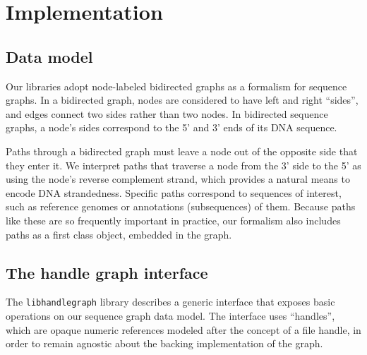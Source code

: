 \documentclass{article}
\begin{document}



\section{Implementation}

\subsection{Data model}

Our libraries adopt node-labeled bidirected graphs as a formalism for sequence graphs.
In a bidirected graph, nodes are considered to have left and right ``sides'', and edges connect two sides rather than two nodes.
In bidirected sequence graphs, a node's sides correspond to the 5' and 3' ends of its DNA sequence. 

Paths through a bidirected graph must leave a node out of the opposite side that they enter it.
We interpret paths that traverse a node from the 3' side to the 5' as using the node's reverse complement strand, which provides a natural means to encode DNA strandedness.
Specific paths correspond to sequences of interest, such as reference genomes or annotations (subsequences) of them.
Because paths like these are so frequently important in practice, our formalism also includes paths as a first class object, embedded in the graph.

\subsection{The handle graph interface}

The \texttt{libhandlegraph} library describes a generic interface that exposes basic operations on our sequence graph data model.
The interface uses ``handles'', which are opaque numeric references modeled after the concept of a file handle, in order to remain agnostic about the backing implementation of the graph.
\end{document}

